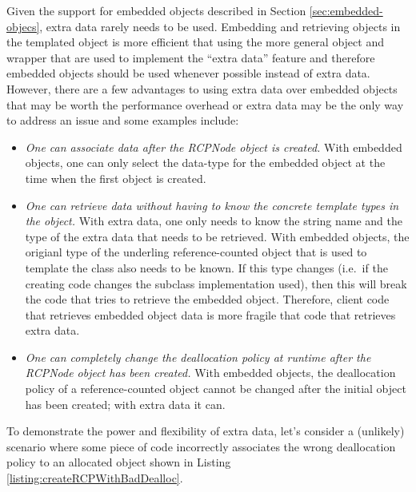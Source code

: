 \documentclass[pdf,ps2pdf,11pt]{SANDreport}
\begin{document}
Given the support for embedded objects described in Section
{}\ref{sec:embedded-objecs}, extra data rarely needs to be used.
Embedding and retrieving objects in the templated {}
object is more efficient that using the more general {}
object and {} wrapper that are used to implement the ``extra
data'' feature and therefore embedded objects should be used whenever
possible instead of extra data.  However, there are a few advantages
to using extra data over embedded objects that may be worth the
performance overhead or extra data may be the only way to address an
issue and some examples include:

\begin{itemize}

{}\item\textit{One can associate data after the RCPNode object is
created.}  With embedded objects, one can only select the data-type
for the embedded object at the time when the first {} object
is created.

{}\item\textit{One can retrieve data without having to know the
concrete template types in the {} object.}  With
extra data, one only needs to know the string name and the type of the
extra data that needs to be retrieved.  With embedded objects, the
origianl type of the underling reference-counted object that is used
to template the {} class also needs to be known.  If
this type changes (i.e.\ if the creating code changes the subclass
implementation used), then this will break the code that tries to
retrieve the embedded object.  Therefore, client code that retrieves
embedded object data is more fragile that code that retrieves extra
data.

{}\item\textit{One can completely change the deallocation policy at
runtime after the RCPNode object has been created.}  With embedded
objects, the deallocation policy of a reference-counted object cannot
be changed after the initial {} object has been
created; with extra data it can.

\end{itemize}

To demonstrate the power and flexibility of extra data, let's consider
a (unlikely) scenario where some piece of code incorrectly associates
the wrong deallocation policy to an allocated object shown in Listing
{}\ref{listing:createRCPWithBadDealloc}.
\end{document}
